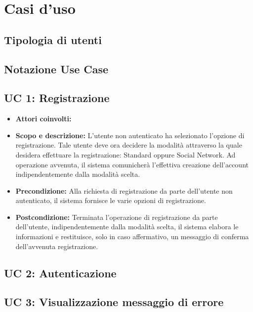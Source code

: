 \section{Casi d'uso}
\subsection{Tipologia di utenti}
\subsection{Notazione Use Case}
\subsection{UC 1: Registrazione}
	\begin{itemize}
		\item \textbf{Attori coinvolti:}
		\item \textbf{Scopo e descrizione:} L'utente non autenticato ha selezionato l'opzione di registrazione. Tale utente deve ora decidere la modalità attraverso la quale desidera effettuare la registrazione: Standard oppure Social Network. Ad operazione avvenuta, il sistema comunicherà l'effettiva creazione dell'account indipendentemente dalla modalità scelta. \\
		\item \textbf{Precondizione:} Alla richiesta di registrazione da parte dell'utente non autenticato, il sistema fornisce le varie opzioni di registrazione. \\
		\item \textbf{Postcondizione:} Terminata l'operazione di registrazione da parte dell'utente, indipendentemente dalla modalità scelta, il sistema elabora le informazioni e restituisce, solo in caso affermativo, un messaggio di conferma dell'avvenuta registrazione. \\
	\end{itemize}
\subsection{UC 2: Autenticazione}
\subsection{UC 3: Visualizzazione messaggio di errore}